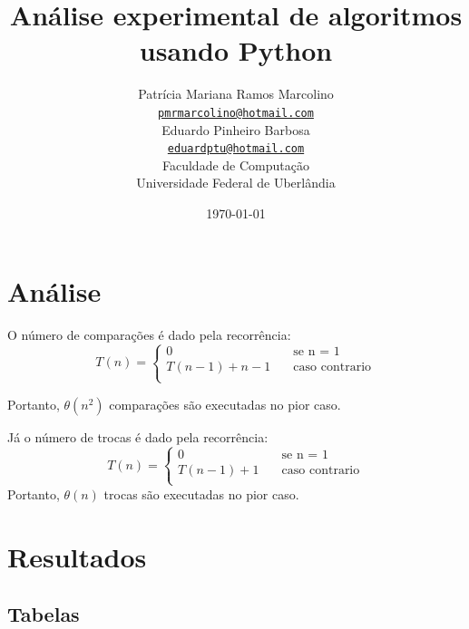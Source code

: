 \documentclass[12pt,a4paper,twoside]{report}
\title{Análise experimental de algoritmos usando Python}
\author{Patrícia Mariana Ramos Marcolino \\
\texttt{\small \url{pmrmarcolino@hotmail.com}}
\vspace{1cm} \\
Eduardo Pinheiro Barbosa \\
\texttt{\small \url{eduardptu@hotmail.com}}
\vspace{1cm} \\
Faculdade de Computação \\
Universidade Federal de Uberlândia
}
\date{\today}
\begin{document}
\maketitle
\listoffigures
\listoftables
\lstlistoflistings

\tableofcontents
\fancyhead[RE,LO]{\thesection}

\setlength{\parskip}{0.15in} %

\chapter{Análise}
O número de comparações é dado pela recorrência:
\begin{equation}
    T(n) =
          \begin{cases}
                0       & \quad \text{se n = 1}\\
               T(n − 1) + n − 1  & \quad \text{caso contrario}\\
          \end{cases}
\end{equation}
 
Portanto, $\theta(n^2)$ comparações são executadas no pior caso.

Já o número de trocas é dado pela recorrência:
\begin{equation}
    T(n) =
          \begin{cases}
                0       & \quad \text{se n = 1}\\
               T(n − 1) + 1  & \quad \text{caso contrario}\\
          \end{cases}
\end{equation}
Portanto, $\theta(n)$ trocas são executadas no pior caso.


\chapter{Resultados}
\section{Tabelas}
\end{document}
